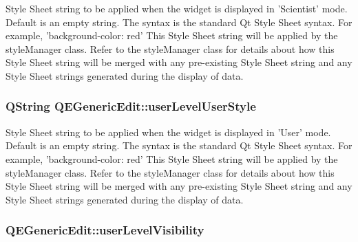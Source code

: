 \label{classQEGenericEdit_a98fef02145d98961debe3cdc8fa8cb9c}
Style Sheet string to be applied when the widget is displayed in 'Scientist' mode. Default is an empty string. The syntax is the standard Qt Style Sheet syntax. For example, 'background-\/color: red' This Style Sheet string will be applied by the styleManager class. Refer to the styleManager class for details about how this Style Sheet string will be merged with any pre-\/existing Style Sheet string and any Style Sheet strings generated during the display of data. \hypertarget{classQEGenericEdit_a13421ac7b96c448d3ed92d69713b52d5}{
\subsubsection[{userLevelUserStyle}]{\setlength{\rightskip}{0pt plus 5cm}QString QEGenericEdit::userLevelUserStyle}}
\label{classQEGenericEdit_a13421ac7b96c448d3ed92d69713b52d5}
Style Sheet string to be applied when the widget is displayed in 'User' mode. Default is an empty string. The syntax is the standard Qt Style Sheet syntax. For example, 'background-\/color: red' This Style Sheet string will be applied by the styleManager class. Refer to the styleManager class for details about how this Style Sheet string will be merged with any pre-\/existing Style Sheet string and any Style Sheet strings generated during the display of data. \hypertarget{classQEGenericEdit_a7f0733266f39549d361cdf65e34ebd30}{
\subsubsection[{userLevelVisibility}]{ QEGenericEdit::userLevelVisibility}}
\label{classQEGenericEdit_a7f0733266f39549d361cdf65e34ebd30}
